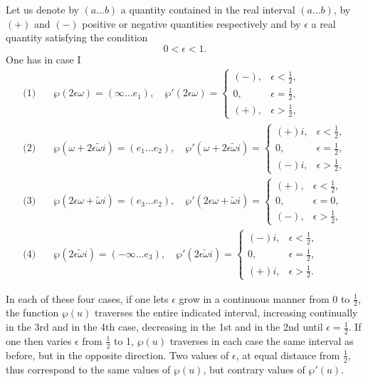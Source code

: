 \documentclass{article}
\begin{document}
Let us denote by $(a \ldots b)$ a quantity contained in the real interval $(a \ldots b)$, by $(+)$ and $(-)$ positive or negative quantities respectively and by $\epsilon$ a real quantity satisfying the condition
\[
0 < \epsilon < 1.
\]
One has in case I
\begin{align*}
\text{(1)} \quad & \wp(2\epsilon\omega) = (\infty \ldots e_1), \quad
\wp'(2\epsilon\omega) = \begin{cases}
(-), & \epsilon < \frac{1}{2}, \\
0, & \epsilon = \frac{1}{2}, \\
(+), & \epsilon > \frac{1}{2},
\end{cases} \\
\text{(2)} \quad & \wp(\omega + 2\epsilon\tilde{\omega}i) = (e_1 \ldots e_2), \quad
\wp'(\omega + 2\epsilon\tilde{\omega}i) = \begin{cases}
(+)i, & \epsilon < \frac{1}{2}, \\
0, & \epsilon = \frac{1}{2}, \\
(-)i, & \epsilon > \frac{1}{2},
\end{cases} \\
\text{(3)} \quad & \wp(2\epsilon\omega + \tilde{\omega}i) = (e_3 \ldots e_2), \quad
\wp'(2\epsilon\omega + \tilde{\omega}i) = \begin{cases}
(+), & \epsilon < \frac{1}{2}, \\
0, & \epsilon = 0, \\
(-), & \epsilon > \frac{1}{2},
\end{cases} \\
\text{(4)} \quad & \wp(2\epsilon\tilde{\omega}i) = (-\infty \ldots e_3), \quad
\wp'(2\epsilon\tilde{\omega}i) = \begin{cases}
(-)i, & \epsilon < \frac{1}{2}, \\
0, & \epsilon = \frac{1}{2}, \\
(+)i, & \epsilon > \frac{1}{2}.
\end{cases}
\end{align*}

In each of these four cases, if one lets $\epsilon$ grow in a continuous manner from 0 to $\frac{1}{2}$, 
the function $\wp(u)$ traverses the entire indicated interval, increasing continually in the 3rd and in the 4th case, decreasing in the 1st and in the 2nd until $\epsilon = \frac{1}{2}$. 
If one then varies $\epsilon$ from $\frac{1}{2}$ to 1, $\wp(u)$ traverses in each case the same interval as before, but in the opposite direction. 
Two values of $\epsilon$, at equal distance from $\frac{1}{2}$, thus correspond to the same values of $\wp(u)$, but contrary values of $\wp'(u)$.
\end{document}
